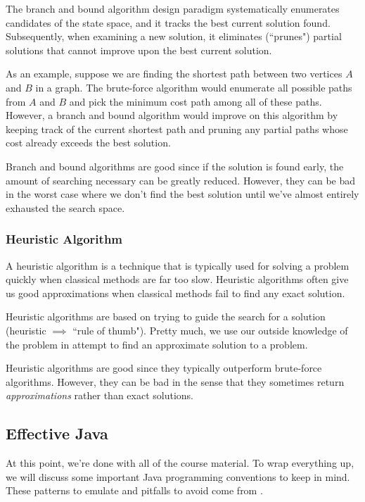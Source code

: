 The branch and bound algorithm design paradigm systematically enumerates candidates of the state space, and it tracks the best current solution found. Subsequently, when examining a new solution, it eliminates (``prunes") partial solutions that cannot improve upon the best current solution.

As an example, suppose we are finding the shortest path between two vertices $A$ and $B$ in a graph. The brute-force algorithm would enumerate all possible paths from $A$ and $B$ and pick the minimum cost path among all of these paths. However, a branch and bound algorithm would improve on this algorithm by keeping track of the current shortest path and pruning any partial paths whose cost already exceeds the best solution. 

Branch and bound algorithms are good since if the solution is found early, the amount of searching necessary can be greatly reduced. However, they can be bad in the worst case where we don't find the best solution until we've almost entirely exhausted the search space.

\subsubsection{Heuristic Algorithm}

A heuristic algorithm is a technique that is typically used for solving a problem quickly when classical methods are far too slow. Heuristic algorithms often give us good approximations when classical methods fail to find any exact solution.

Heuristic algorithms are based on trying to guide the search for a solution (heuristic $\implies$ ``rule of thumb"). Pretty much, we use our outside knowledge of the problem in attempt to find an approximate solution to a problem. 

Heuristic algorithms are good since they typically outperform brute-force algorithms. However, they can be bad in the sense that they sometimes return \textit{approximations} rather than exact solutions. 

\subsection{Effective Java}

At this point, we're done with all of the course material. To wrap everything up, we will discuss some important Java programming conventions to keep in mind. These patterns to emulate and pitfalls to avoid come from \cite{effectivejava}.

